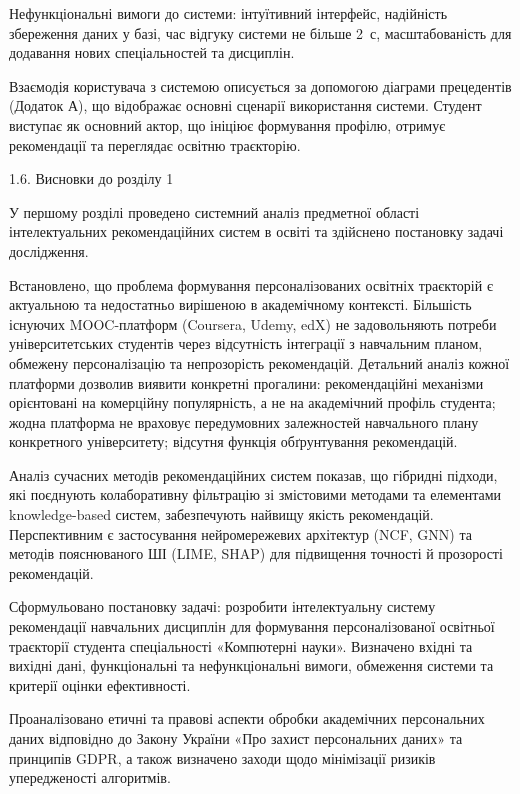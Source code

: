 \documentclass[
]{article}
\begin{document}
Нефункціональні вимоги до системи: інтуїтивний інтерфейс, надійність
збереження даних у базі, час відгуку системи не більше 2~с,
масштабованість для додавання нових спеціальностей та дисциплін.

Взаємодія користувача з системою описується за допомогою діаграми
прецедентів (Додаток А), що відображає основні сценарії використання
системи. Студент виступає як основний актор, що ініціює формування
профілю, отримує рекомендації та переглядає освітню траєкторію.

\protect{}\label{_Toc230434084}{}1.6. Висновки до розділу 1

У першому розділі проведено системний аналіз предметної області
інтелектуальних рекомендаційних систем в освіті та здійснено постановку
задачі дослідження.

Встановлено, що проблема формування персоналізованих освітніх траєкторій
є актуальною та недостатньо вирішеною в академічному контексті.
Більшість існуючих MOOC-платформ (Coursera, Udemy, edX) не задовольняють
потреби університетських студентів через відсутність інтеграції з
навчальним планом, обмежену персоналізацію та непрозорість рекомендацій.
Детальний аналіз кожної платформи дозволив виявити конкретні прогалини:
рекомендаційні механізми орієнтовані на комерційну популярність, а не на
академічний профіль студента; жодна платформа не враховує передумовних
залежностей навчального плану конкретного університету; відсутня функція
обґрунтування рекомендацій.

Аналіз сучасних методів рекомендаційних систем показав, що гібридні
підходи, які поєднують колаборативну фільтрацію зі змістовими методами
та елементами knowledge-based систем, забезпечують найвищу якість
рекомендацій. Перспективним є застосування нейромережевих архітектур
(NCF, GNN) та методів пояснюваного ШІ (LIME, SHAP) для підвищення
точності й прозорості рекомендацій.

Сформульовано постановку задачі: розробити інтелектуальну систему
рекомендації навчальних дисциплін для формування персоналізованої
освітньої траєкторії студента спеціальності «Комп\textquotesingle ютерні
науки». Визначено вхідні та вихідні дані, функціональні та
нефункціональні вимоги, обмеження системи та критерії оцінки
ефективності.

Проаналізовано етичні та правові аспекти обробки академічних
персональних даних відповідно до Закону України «Про захист персональних
даних» та принципів GDPR, а також визначено заходи щодо мінімізації
ризиків упередженості алгоритмів.
\end{document}
